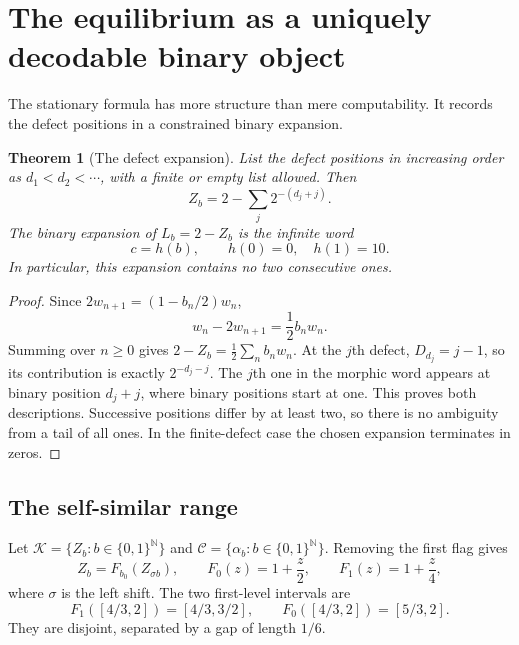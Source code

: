 \documentclass[11pt,letterpaper]{article}
\numberwithin{equation}{section}
\newtheorem{theorem}{Theorem}[section]
\theoremstyle{definition}
\theoremstyle{remark}
\newcommand{\N}{\mathbb N}
\newcommand{\srcmark}[1]{\par\noindent{\small\itshape [source~#1]}\par}
\newcommand{\sg}{\sigma}
\begin{document}
\section{The equilibrium as a uniquely decodable binary object}
\label{pqc:rv:sec:coding}
\srcmark{17}
The stationary formula has more structure than mere computability.
It records the defect positions in a constrained binary expansion.

\begin{theorem}[The defect expansion]\label{pqc:rv:thm:defects}
List the defect positions in increasing order as $d_1<d_2<\cdots$,
with a finite or empty list allowed. Then
\begin{equation}\label{pqc:rv:eq:defect-series}
 Z_b=2-\sum_j2^{-(d_j+j)}.
\end{equation}
The binary expansion of $L_b=2-Z_b$ is the infinite word
\begin{equation}\label{pqc:rv:eq:morphism}
 c=h(b),\qquad h(0)=0,\quad h(1)=10.
\end{equation}
In particular, this expansion contains no two consecutive ones.
\end{theorem}
\begin{proof}
Since $2w_{n+1}=(1-b_n/2)w_n$,
\[
 w_n-2w_{n+1}=\frac12 b_nw_n.
\]
Summing over $n\geq0$ gives $2-Z_b=\tfrac12\sum_n b_nw_n$.
At the $j$th defect, $D_{d_j}=j-1$, so its contribution is exactly
$2^{-d_j-j}$. The $j$th one in the morphic word appears at binary
position $d_j+j$, where binary positions start at one. This proves
both descriptions. Successive positions differ by at least two, so
there is no ambiguity from a tail of all ones. In the finite-defect
case the chosen expansion terminates in zeros.
\end{proof}

\subsection{The self-similar range}
Let $\mathcal K=\{Z_b:b\in\{0,1\}^{\N}\}$ and
$\mathcal C=\{\alpha_b:b\in\{0,1\}^{\N}\}$. Removing the first
flag gives
\begin{equation}\label{pqc:rv:eq:ifs}
 Z_b=F_{b_0}(Z_{\sg b}),\qquad
 F_0(z)=1+\frac z2,\qquad F_1(z)=1+\frac z4,
\end{equation}
where $\sg$ is the left shift. The two first-level intervals are
\begin{equation}\label{pqc:rv:eq:interval-gap}
 F_1([4/3,2])=[4/3,3/2],\qquad
 F_0([4/3,2])=[5/3,2].
\end{equation}
They are disjoint, separated by a gap of length $1/6$.
\end{document}

